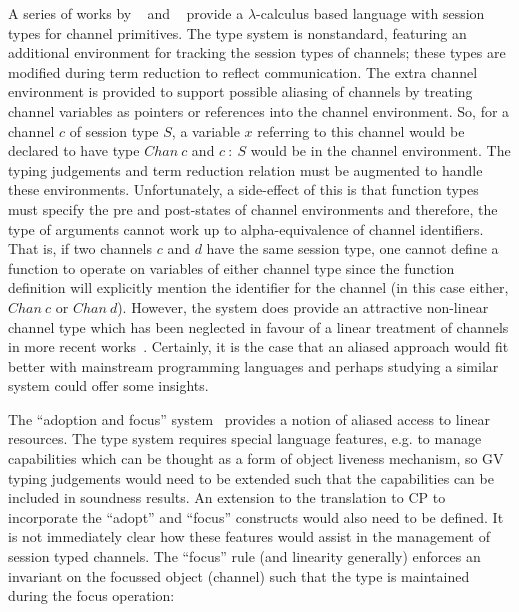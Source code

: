 A series of works by \citeauthor{Gay:2003:STI}~\cite{Gay:2003:STI} and
\citeauthor{Vasconcelos:2006:TCM}~\cite{Vasconcelos:2006:TCM} provide a
$\lambda$-calculus based language with session types for channel
primitives. The type system is nonstandard, featuring an additional
environment for tracking the session types of channels; these types are
modified during term reduction to reflect communication. The extra channel
environment is provided to support possible aliasing of channels by treating
channel variables as pointers or references into the channel environment. So,
for a channel $c$ of session type $S$, a variable $x$ referring to this
channel would be declared to have type $Chan~c$ and $c~:~S$ would be in the
channel environment. The typing judgements and term reduction relation must be
augmented to handle these environments. Unfortunately, a side-effect of this
is that function types must specify the pre and post-states of channel
environments and therefore, the type of arguments cannot work up to
alpha-equivalence of channel identifiers. That is, if two channels $c$ and $d$
have the same session type, one cannot define a function to operate on
variables of either channel type since the function definition will explicitly
mention the identifier for the channel (in this case either, $Chan~c$ or
$Chan~d$). However, the system does provide an attractive non-linear channel
type which has been neglected in favour of a linear treatment of channels in
more recent
works~\cite{Gay:2010:LAST,Mazurak:2010:LCC,Wadler:2014}. Certainly, it is the
case that an aliased approach would fit better with mainstream programming
languages and perhaps studying a similar system could offer some insights.

The ``adoption and focus'' system~\cite{Fahndrich:2002} provides a notion of
aliased access to linear resources. The type system requires special language
features, e.g. to manage capabilities which can be thought as a form of object
liveness mechanism, so GV typing judgements would need to be extended such
that the capabilities can be included in soundness results. An extension to
the translation to CP to incorporate the ``adopt'' and ``focus'' constructs
would also need to be defined. It is not immediately clear how these features
would assist in the management of session typed channels. The ``focus'' rule
(and linearity generally) enforces an invariant on the focussed object
(channel) such that the type is maintained during the focus operation:


